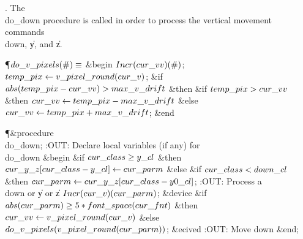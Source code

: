 . The \\{do\_down} procedure is called in order to process the vertical
movement commands \\{down}, \|y, and \|z.

\Y\P\D {}$\\{do\_v\_pixels}(\#)\S$%
\6
\&{begin} $\\{Incr}(\\{cur\_vv})(\#)$;\5
$\\{temp\_pix}\K\\{v\_pixel\_round}(\\{cur\_v})$;\6
\&{if} $\\{abs}(\\{temp\_pix}-\\{cur\_vv})>\\{max\_v\_drift}$ \1\&{then}\6
\&{if} $\\{temp\_pix}>\\{cur\_vv}$ \1\&{then}\5
$\\{cur\_vv}\K\\{temp\_pix}-\\{max\_v\_drift}$\6
\4\&{else} $\\{cur\_vv}\K\\{temp\_pix}+\\{max\_v\_drift}$;\2\2\6
\&{end}\par
\Y\P\4\&{procedure}\1\  \\{do\_down};\6
:OUT: Declare local variables (if any) for \\{do\_down}\X\2\6
\&{begin} \&{if} $\\{cur\_class}\G\\{y\_cl}$ \1\&{then}\5
$\\{cur\_y\_z}[\\{cur\_class}-\\{y\_cl}]\K\\{cur\_parm}$\6
\4\&{else} \&{if} $\\{cur\_class}<\\{down\_cl}$ \1\&{then}\5
$\\{cur\_parm}\K\\{cur\_y\_z}[\\{cur\_class}-\\{y0\_cl}]$;\2\2\6
:OUT: Process a \\{down} or \|y or \|z\X\6
$\\{Incr}(\\{cur\_v})(\\{cur\_parm})$;\6
\&{device} \&{if} $\\{abs}(\\{cur\_parm})\G5\ast\\{font\_space}(\\{cur%
\_fnt})$ \1\&{then}\5
$\\{cur\_vv}\K\\{v\_pixel\_round}(\\{cur\_v})$\6
\4\&{else} $\\{do\_v\_pixels}(\\{v\_pixel\_round}(\\{cur\_parm}))$;\2\6
\&{ecived}\6
:OUT: Move down\X\6
\&{end};\par
\fi


